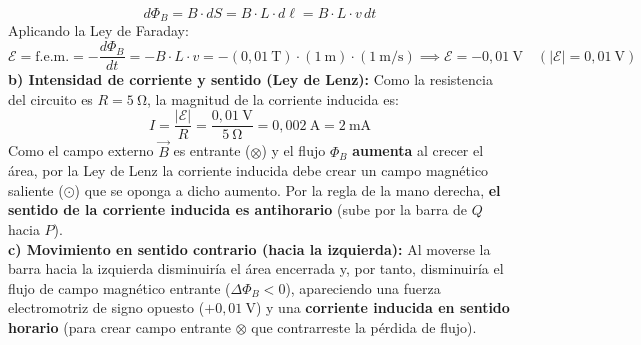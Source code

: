 \begin{ejercicio}
\begin{equation}
    d\Phi_B = B \cdot dS = B \cdot L \cdot d\ell = B \cdot L \cdot v\, dt
\end{equation}
Aplicando la Ley de Faraday:
\begin{equation}
    \mathcal{E} = \text{f.e.m.} = -\frac{d\Phi_B}{dt} = -B \cdot L \cdot v = -(0{,}01\ \si{\tesla}) \cdot (1\ \si{\meter}) \cdot (1\ \si{\meter\per\second}) \implies \boxed{\mathcal{E} = -0{,}01\ \si{\volt}\quad (|\mathcal{E}| = 0{,}01\ \si{\volt})}
\end{equation}
\textbf{b) Intensidad de corriente y sentido (Ley de Lenz):}
Como la resistencia del circuito es $R = 5\ \si{\ohm}$, la magnitud de la corriente inducida es:
\begin{equation}
    I = \frac{|\mathcal{E}|}{R} = \frac{0{,}01\ \si{\volt}}{5\ \si{\ohm}} = 0{,}002\ \si{\ampere} = 2\ \si{\milli\ampere}
\end{equation}
Como el campo externo $\vec{B}$ es entrante ($\otimes$) y el flujo $\Phi_B$ \textbf{aumenta} al crecer el área, por la Ley de Lenz la corriente inducida debe crear un campo magnético saliente ($\odot$) que se oponga a dicho aumento. Por la regla de la mano derecha, \textbf{el sentido de la corriente inducida es antihorario} (sube por la barra de $Q$ hacia $P$).\\[4pt]
\textbf{c) Movimiento en sentido contrario (hacia la izquierda):}
Al moverse la barra hacia la izquierda disminuiría el área encerrada y, por tanto, disminuiría el flujo de campo magnético entrante ($\Delta\Phi_B < 0$), apareciendo una fuerza electromotriz de signo opuesto ($+0{,}01\ \si{\volt}$) y una \textbf{corriente inducida en sentido horario} (para crear campo entrante $\otimes$ que contrarreste la pérdida de flujo).
\end{ejercicio}

